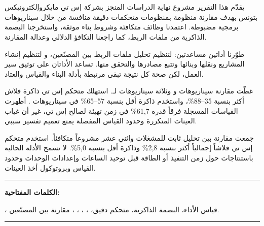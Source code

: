 \chapter*{}

\begin{RLtext}

\noindent يقدّم هذا التقرير مشروع نهاية الدراسات المنجز بشركة إس تي مايكروإلكترونيكس بتونس بهدف مقارنة منظومة  بمنظومات متحكمات دقيقة منافسة من خلال سيناريوهات برمجية مضبوطة. اعتمدنا وظائف متكافئة وشروط بناء موثقة، واستخرجنا البصمة الذاكرية من ملفات الربط، كما راجعنا التكافؤ الدلالي وعدالة المقارنة.

طوّرنا أداتين مساعدتين:  لتنظيم تحليل ملفات الربط بين المصنّعين، و لتنظيم إنشاء المشاريع ونقلها وبنائها وتتبع مصادرها والتحقق منها. تساعد الأداتان على توثيق سير العمل، لكن صحة كل نتيجة تبقى مرتبطة بأدلة البناء والقياس والعتاد.

غطّت مقارنة  سيناريوهات  و وثلاثة سيناريوهات لـ. استهلك متحكم إس تي ذاكرة فلاش أكثر بنسبة 35--88\%، واستخدم ذاكرة  أقل بنسبة 57--65\% في سيناريوهات . أظهرت القياسات المسجلة فرقاً قدره 61,7\% في زمن تهيئة  لصالح إس تي، غير أن غياب العينات المتكررة وحدود القياس المفصلة يمنع تعميم تفسير سببي.

جمعت مقارنة  بين تحليل ثابت للمشغلات واثني عشر مشروعاً متكافئاً. استخدم متحكم إس تي فلاشاً إجمالياً أكثر بنسبة 2,8\% وذاكرة  أقل بنسبة 5,0\%. لا تسمح الأدلة الحالية باستنتاجات حول زمن التنفيذ أو الطاقة قبل توحيد الساعات وإعدادات الوحدات وحدود القياس وبروتوكول أخذ العينات.

\end{RLtext}

\noindent\rule[2pt]{\textwidth}{0.5pt}

\begin{RLtext}

{\textbf{الكلمات المفتاحية:}}

، قياس الأداء، البصمة الذاكرية، متحكم دقيق، ، ، ، ، مقارنة بين المصنّعين.
\\

\end{RLtext}

\noindent\rule[2pt]{\textwidth}{0.5pt}
